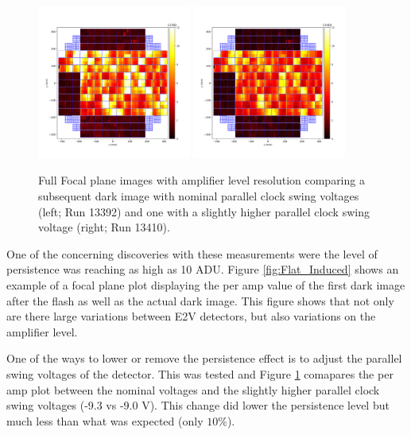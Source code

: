 \documentclass[DM,authoryear,toc]{lsstdoc}
\begin{document}
\begin{figure}[!htp]
  \centering
  \includegraphics[width=0.45\textwidth, angle=0]{Run_13392_Persistence.png}
  \includegraphics[width=0.45\textwidth, angle=0]{Run_13410_Persistence_Lower.png}
  \caption{
  Full Focal plane images with amplifier level resolution comparing a subsequent dark image with nominal parallel clock swing voltages (left; Run 13392) 
  and one with a slightly higher parallel clock swing voltage (right; Run 13410).
  }\label{fig:Flat_Induced_Comparison}
\end{figure}

One of the concerning discoveries with these measurements were the level of persistence was reaching as high as 10 ADU.
Figure \ref{fig:Flat_Induced} shows an example of a focal plane plot displaying the per amp value of the first dark image after the flash as well as the actual dark image.
This figure shows that not only are there large variations between E2V detectors, but also variations on the amplifier level.

One of the ways to lower or remove the persistence effect is to adjust the parallel swing voltages of the detector.
This was tested and Figure \ref{fig:Flat_Induced_Comparison} comapares the per amp plot between the nominal voltages and the slightly higher parallel clock swing voltages (-9.3 vs -9.0 V).
This change did lower the persistence level but much less than what was expected (only $10\%$).
\end{document}
